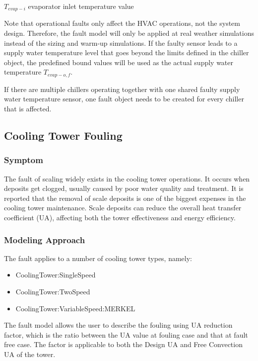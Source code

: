 \(T_{evap-i}\) evaporator inlet temperature value 

Note that operational faults only affect the HVAC operations, not the system design. Therefore, the fault model will only be applied at real weather simulations instead of the sizing and warm-up simulations. If the faulty sensor leads to a supply water temperature level that goes beyond the limits defined in the chiller object, the predefined bound values will be used as the actual supply water temperature \(T_{evap-o,f}\).

If there are multiple chillers operating together with one shared faulty supply water temperature sensor, one fault object needs to be created for every chiller that is affected.


\subsection{Cooling Tower Fouling}\label{cooling-tower-fouling}

\subsubsection{Symptom}

The fault of scaling widely exists in the cooling tower operations. It occurs when deposits get clogged, usually caused by poor water quality and treatment. It is reported that the removal of scale deposits is one of the biggest expenses in the cooling tower maintenance. Scale deposits can reduce the overall heat transfer coefficient (UA), affecting both the tower effectiveness and energy efficiency.

\subsubsection{Modeling Approach}

The fault applies to a number of cooling tower types, namely:

\begin{itemize}
\tightlist
\item
  CoolingTower:SingleSpeed
\item
  CoolingTower:TwoSpeed
\item
  CoolingTower:VariableSpeed:MERKEL
\end{itemize}

The fault model allows the user to describe the fouling using UA reduction factor, which is the ratio between the UA value at fouling case and that at fault free case. The factor is applicable to both the Design UA and Free Convection UA of the tower. 

